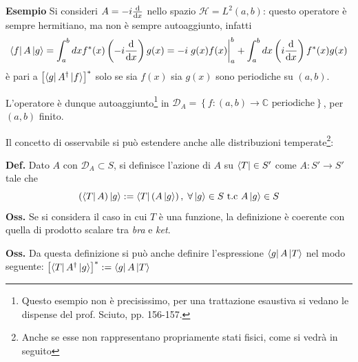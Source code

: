 \textbf{Esempio} Si consideri $ A = -i\dv{x} $ nello spazio $ \mathcal{H} = L^2(a,b) $: 
questo operatore è sempre hermitiano, ma non è sempre autoaggiunto, infatti
$$ \bra{f}A\ket{g} = \int_{a}^{b}dxf^*(x)\left(-i\dv{x}\right)g(x) =
-i\eval{g(x)f(x)}_a^b + \int_{a}^{b}dx\left(i\dv{x}\right)f^*(x)g(x)$$
è pari a $ \left[ \bra{g}A^{\dagger}\ket{f} \right]^* $ solo se sia $ f(x) $ sia $ g(x) $
sono periodiche su $ (a,b) $.

L'operatore è dunque autoaggiunto\footnote{Questo esempio non è precisissimo, per una trattazione
esaustiva si vedano le dispense del prof. Sciuto, pp. 156-157.} in
$ \mathcal{D}_A = \left\{ f:(a,b)\to\mathbb{C} \text{ periodiche} \right\}$, per $ (a,b)$ finito.

Il concetto di osservabile si può estendere anche alle distribuzioni temperate\footnote{
    Anche se esse non rappresentano propriamente stati fisici, come si vedrà
in seguito}:

\textbf{Def.} Dato $ A$ con $ \mathcal{D}_A\subset S $, si definisce l'azione di $ A $ su 
$ \bra{T} \in S'$ come $ A: S'\to S' $ tale che
$$ \left(\bra{T}A\right)\ket{g} := \bra{T}\left(A\ket{g}\right),\; \forall \ket{g}\in S \text{ t.c } A\ket{g}\in S$$
\textbf{Oss.} Se si considera il caso in cui $ T$ è una funzione, la definizione è coerente con
quella di prodotto scalare tra \textit{bra} e \textit{ket}.

\textbf{Oss.} Da questa definizione si può anche definire l'espressione $\bra{g}A\ket{T}$
nel modo seguente: $ \left[\bra{T}A^{\dagger}\ket{g}\right]^* := \bra{g}A\ket{T} $ 
